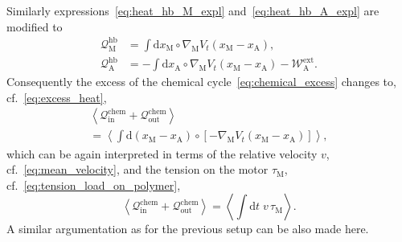 \documentclass[aps,pre,twocolumn,showpacs,showkeys,superscriptaddress,floatfix]{revtex4-1}
\newcommand{\rmd}{{\mathrm d}}
\begin{document}
Similarly expressions~\eqref{eq:heat_hb_M_expl} and~\eqref{eq:heat_hb_A_expl} are modified to
\begin{align*}
{\mathcal Q}_\text{M}^\text{hb} 
&= \int \rmd x_\text{M} \circ \nabla_\text{M} V_t(x_\text{M} - x_\text{A} ) ,
\\
{\mathcal Q}_\text{A}^\text{hb} 
&= - \int \rmd x_\text{A} \circ \nabla_\text{M} V_t(x_\text{M} - x_\text{A} ) - {\mathcal W}_\text{A}^\text{ext} .
\end{align*} 
Consequently the excess of the chemical cycle~\eqref{eq:chemical_excess} changes to, cf.~\eqref{eq:excess_heat}, 
\begin{multline*}
\left\langle 
{\mathcal Q}_\text{in}^\text{chem} + {\mathcal Q}_\text{out}^\text{chem} 
\right\rangle 
\\
= 
\left\langle 
\int \rmd \left( x_\text{M} - x_\text{A} \right) \circ \left[ - \nabla_\text{M} V_t( x_\text{M} - x_\text{A} ) \right]
\right\rangle ,
\end{multline*} 
which can be again interpreted in terms of the relative velocity $v$, cf.~\eqref{eq:mean_velocity}, 
and the tension on the motor $\tau_\text{M}$, cf.~\eqref{eq:tension_load_on_polymer},  
\begin{equation}
\left\langle 
{\mathcal Q}_\text{in}^\text{chem} + {\mathcal Q}_\text{out}^\text{chem} 
\right\rangle 
= \left\langle \int \rmd t \; v \, \tau_\text{M} \right\rangle .
\label{eq:chemical_excess_poly}
\end{equation}
A similar argumentation as for the previous setup can be also made here. 
\end{document}
